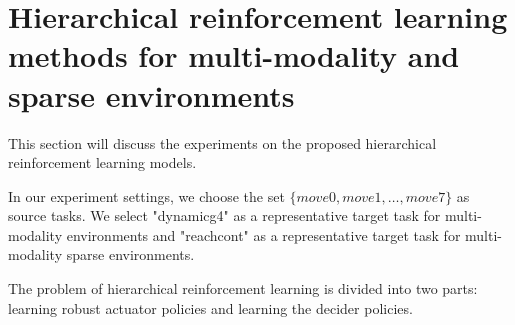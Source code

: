 
\section{Hierarchical reinforcement learning methods for multi-modality and sparse environments}
This section will discuss the experiments on the proposed hierarchical reinforcement learning models.

In our experiment settings, we choose the set $\{move0, move1, \dots, move7 \}$ as source tasks. We select "dynamicg4" as a representative target task for multi-modality environments and "reachcont" as a representative target task for multi-modality sparse environments.

The problem of hierarchical reinforcement learning is divided into two parts: learning robust actuator policies and learning the decider policies.